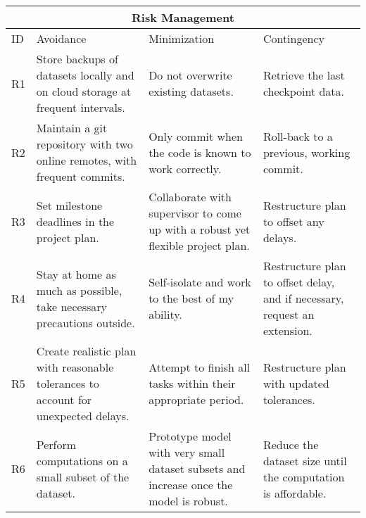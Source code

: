 \documentclass[a4paper,11pt]{article}
\begin{document}
\begin{longtable}[c]{|p{}|p{}|p{}|p{}|}
\hline
\multicolumn{4}{|c|}{Risk Management}                                                                                                                                                                                                                        \\ \hline

ID & Avoidance                                                                          & Minimization                                                                           & Contingency                                                               \\ \midrule
\endhead
R1 & Store backups of datasets locally and on cloud storage at frequent intervals.      & Do not overwrite existing datasets.                                                    & Retrieve the last checkpoint data.                                        \\ \midrule
R2 & Maintain a git repository with two online remotes, with frequent commits.            & Only commit when the code is known to work correctly.                                  & Roll-back to a previous, working commit.                                  \\ \midrule
R3 & Set milestone deadlines in the project plan.                                       & Collaborate with supervisor to come up with a robust yet flexible project plan.        & Restructure plan to offset any delays.                                    \\ \midrule
R4 & Stay at home as much as possible, take necessary precautions outside.              & Self-isolate and work to the best of my ability.                                       & Restructure plan to offset delay, and if necessary, request an extension. \\ \midrule
R5 & Create realistic plan with reasonable tolerances to account for unexpected delays. & Attempt to finish all tasks within their appropriate period.                           & Restructure plan with updated tolerances.                                 \\ \midrule
R6 & Perform computations on a small subset of the dataset.                             & Prototype model with very small dataset subsets and increase once the model is robust. & Reduce the dataset size until the computation is affordable.              \\ \bottomrule
\end{longtable}
\end{document}
